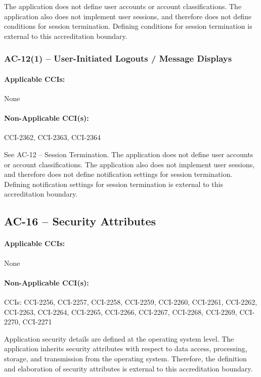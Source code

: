 \documentclass[letterpaper, 10pt, twoside]{article}
\begin{document}
{The application does not define user accounts or account classifications. The application also does not implement user sessions, and therefore does not define conditions for session termination. Defining conditions for session termination is external to this accreditation boundary.

\subsubsection{AC-12(1) -- User-Initiated Logouts / Message Displays}

\paragraph{Applicable CCIs:} None

\paragraph{Non-Applicable CCI(s):} CCI-2362, CCI-2363, CCI-2364

See AC-12 – Session Termination. The application does not define user accounts or account classifications. The application also does not implement user sessions, and therefore does not define notification settings for session termination. Defining notification settings for session termination is external to this accreditation boundary.

\subsection{AC-16 -- Security Attributes}

\paragraph{Applicable CCIs:} None

\paragraph{Non-Applicable CCI(s):} CCIs: CCI-2256, CCI-2257, CCI-2258, CCI-2259, CCI-2260, CCI-2261, CCI-2262, CCI-2263, CCI-2264, CCI-2265, CCI-2266, CCI-2267, CCI-2268, CCI-2269, CCI-2270, CCI-2271

Application security details are defined at the operating system level. The application inherits security attributes with respect to data access, processing, storage, and transmission from the operating system. Therefore, the definition and elaboration of security attributes is external to this accreditation boundary.

}
\end{document}
